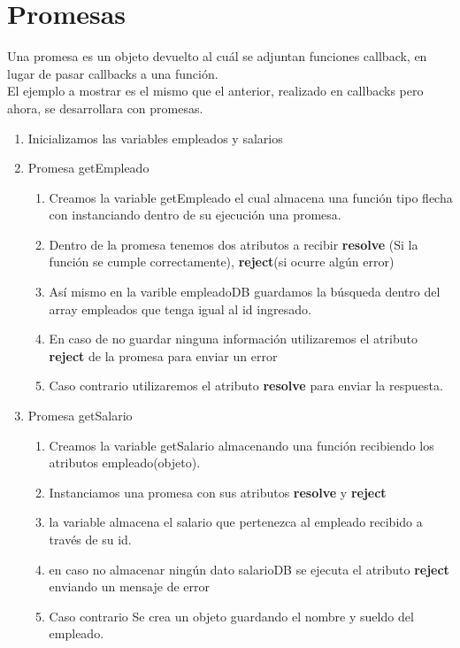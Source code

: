 \documentclass{report}
\begin{document}
\chapter{Promesas}
Una promesa es un objeto devuelto al cuál se adjuntan funciones callback, en lugar de pasar callbacks a una función.\\
El ejemplo a mostrar es el mismo que el anterior, realizado en callbacks pero ahora, se desarrollara con promesas.
\begin{enumerate}
  \item Inicializamos las variables empleados y salarios
  
  \item Promesa getEmpleado
  
  \begin{enumerate}
    \item Creamos la variable getEmpleado el cual almacena una función tipo flecha con instanciando dentro de su ejecución una promesa.
    \item Dentro de la promesa tenemos dos atributos a recibir \textbf{ resolve } (Si la función se cumple correctamente), \textbf{reject}(si ocurre algún error)
    \item Así mismo en la varible empleadoDB guardamos la búsqueda dentro del array empleados que tenga igual al id ingresado.
    \item En caso de no guardar ninguna información utilizaremos el atributo \textbf{reject} de la promesa para enviar un error
    \item Caso contrario utilizaremos el atributo \textbf{resolve} para enviar la respuesta.
  \end{enumerate}
  \item Promesa getSalario
  
  \begin{enumerate}
    \item Creamos la variable getSalario almacenando una función recibiendo los atributos empleado(objeto).
    \item Instanciamos una promesa con sus atributos \textbf{resolve} y \textbf{reject}
    \item la variable almacena el salario que pertenezca al empleado recibido a través de su id.
    \item en caso no almacenar ningún dato salarioDB se ejecuta el atributo \textbf{reject} enviando un mensaje de error
    \item Caso contrario Se crea un objeto guardando el nombre y sueldo del empleado.

\end{enumerate}
\end{enumerate}
\end{document}
